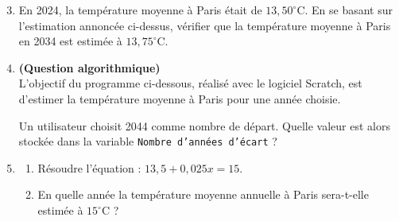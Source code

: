 \begin{enumerate}
	\setcounter{enumi}{2}
	\item En 2024, la température moyenne à Paris était de $13{,}50^{\circ}$C. En se basant sur l'estimation annoncée ci-dessus, vérifier que la température moyenne à Paris en 2034 est estimée à $13{,}75^{\circ}$C.
	\item \textbf{(Question algorithmique)}\\
	L'objectif du programme ci-dessous, réalisé avec le logiciel Scratch, est d'estimer la température moyenne à Paris pour une année choisie.

	\begin{center}
	\begin{scratch}[scale=0.9,num blocks]
	\end{scratch}
	\end{center}

	Un utilisateur choisit 2044 comme nombre de départ. Quelle valeur est alors stockée dans la variable \texttt{Nombre d'années d'écart} ?
	\item 
	\begin{enumerate}
		\item Résoudre l'équation : $13{,}5 + 0{,}025x = 15$.
		\item En quelle année la température moyenne annuelle à Paris sera-t-elle estimée à $15^{\circ}$C ?
	\end{enumerate}
\end{enumerate}

